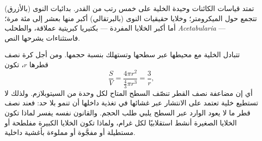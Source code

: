 \begin{omfigure}

{\small تمتد قياسات الكائنات وحيدة الخلية على خمس رتب من القدر.
بدائيات النوى (بالأزرق) تتجمع حول الميكرومتر؛ وخلايا حقيقيات النوى
(بالبرتقالي) أكبر منها بعشر إلى مئة مرة؛ أما أكبر الخلايا المفردة
--- بكتيريا كبريتية عملاقة، والطحلب \emph{Acetabularia} ---
فاستثناءات يشرحها النص.}
\end{omfigure}

\begin{proposition}\label{prop:b2:unicellular-diversity:surface}
تتبادل الخلية مع محيطها عبر سطحها وتستهلك بنسبة حجمها. ومن أجل كرة
نصف قطرها $r$، تكون \emph{}
\[
\frac{S}{V} = \frac{4\pi r^2}{\tfrac{4}{3}\pi r^3} = \frac{3}{r},
\]
أي إن مضاعفة نصف القطر تنصّف السطح المتاح لكل وحدة من السيتوبلازم.
ولذلك لا تستطيع خلية تعتمد على الانتشار عبر غشائها في تغذية داخلها
أن تنمو بلا حد: فعند نصف قطر ما لا يعود الوارد عبر السطح يلبي طلب
الحجم. والقانون نفسه يفسر لماذا تكون الخلايا الصغيرة أنشط استقلابيًا
لكل غرام، ولماذا تكون الخلايا الكبيرة مفلطحة أو مستطيلة أو مفجَّوة
أو مملوءة بأغشية داخلية.
\end{proposition}

